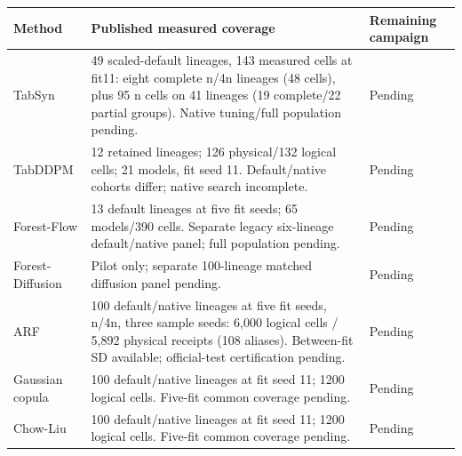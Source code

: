 \begin{tabular}{@{}lp{8.7cm}l@{}}
\toprule
Method & Published measured coverage & Remaining campaign \\
\midrule
TabSyn & 49 scaled-default lineages, 143 measured cells at fit11: eight complete n/4n lineages (48 cells), plus 95 n cells on 41 lineages (19 complete/22 partial groups). Native tuning/full population pending. & Pending \\
TabDDPM & 12 retained lineages; 126 physical/132 logical cells; 21 models, fit seed 11. Default/native cohorts differ; native search incomplete. & Pending \\
Forest-Flow & 13 default lineages at five fit seeds; 65 models/390 cells. Separate legacy six-lineage default/native panel; full population pending. & Pending \\
Forest-Diffusion & Pilot only; separate 100-lineage matched diffusion panel pending. & Pending \\
ARF & 100 default/native lineages at five fit seeds, n/4n, three sample seeds: 6,000 logical cells / 5,892 physical receipts (108 aliases). Between-fit SD available; official-test certification pending. & Pending \\
Gaussian copula & 100 default/native lineages at fit seed 11; 1200 logical cells. Five-fit common coverage pending. & Pending \\
Chow-Liu & 100 default/native lineages at fit seed 11; 1200 logical cells. Five-fit common coverage pending. & Pending \\
\bottomrule
\end{tabular}
